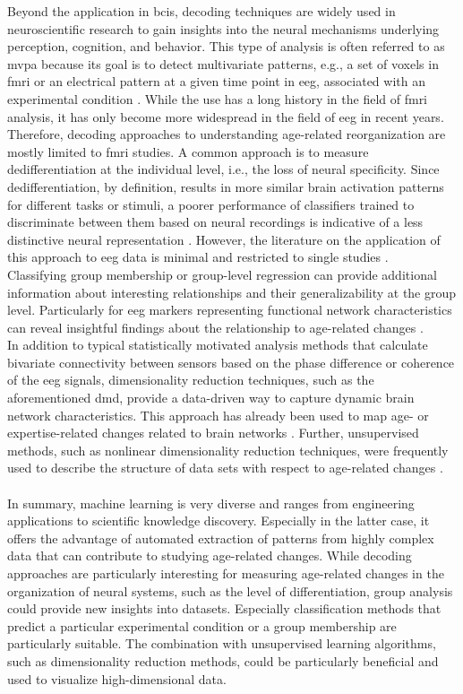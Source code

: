 Beyond the application in \glspl{bci}, decoding techniques are widely used in neuroscientific research to gain insights into the neural mechanisms underlying perception, cognition, and behavior. This type of analysis is often referred to as \gls{mvpa} because its goal is to detect multivariate patterns, e.g., a set of voxels in \gls{fmri} or an electrical pattern at a given time point in \gls{eeg}, associated with an experimental condition \cite{Holdgraf2017}. While the use has a long history in the field of \gls{fmri} analysis, it has only become more widespread in the field of \gls{eeg} in recent years. Therefore, decoding approaches to understanding age-related reorganization are mostly limited to \gls{fmri} studies. A common approach is to measure dedifferentiation at the individual level, i.e., the loss of neural specificity. Since dedifferentiation, by definition, results in more similar brain activation patterns for different tasks or stimuli, a poorer performance of classifiers trained to discriminate between them based on neural recordings is indicative of a less distinctive neural representation \cite{Koen2019, Park2010}. However, the literature on the application of this approach to \gls{eeg} data is minimal and restricted to single studies \cite{Chen2019}.\\
Classifying group membership or group-level regression can provide additional information about interesting relationships and their generalizability at the group level. Particularly for \gls{eeg} markers representing functional network characteristics can reveal insightful findings about the relationship to age-related changes \cite{Petti2016}.\\
In addition to typical statistically motivated analysis methods that calculate bivariate connectivity between sensors based on the phase difference or coherence of the \gls{eeg} signals, dimensionality reduction techniques, such as the aforementioned \gls{dmd}, provide a data-driven way to capture dynamic brain network characteristics. This approach has already been used to map age- or expertise-related changes related to brain networks \cite{Vieluf2018}. Further, unsupervised methods, such as nonlinear dimensionality reduction techniques, were frequently used to describe the structure of data sets with respect to age-related changes \cite{Banville2021,Kottlarz2020}.\\
\\
In summary, machine learning is very diverse and ranges from engineering applications to scientific knowledge discovery. Especially in the latter case, it offers the advantage of automated extraction of patterns from highly complex data that can contribute to studying age-related changes. While decoding approaches are particularly interesting for measuring age-related changes in the organization of neural systems, such as the level of differentiation, group analysis could provide new insights into datasets. Especially classification methods that predict a particular experimental condition or a group membership are particularly suitable. The combination with unsupervised learning algorithms, such as dimensionality reduction methods, could be particularly beneficial and used to visualize high-dimensional data.



